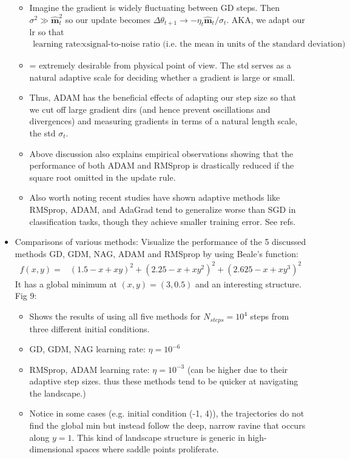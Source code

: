 \documentclass[norsk,a4paper,11pt]{article}
\begin{document}
\begin{itemize}
\begin{itemize}
			\item Imagine the gradient is widely fluctuating between GD steps. Then $\sigma^2 \gg \hat{\mathbf{m}}_t^2$ so our update becomes
			$\Delta \theta_{t+1} \rightarrow -\eta_t \hat{\mathbf{m}}_t/ \sigma_t$. AKA, we adapt our lr so that
			{\tiny
			\begin{align*}
				\text{learning rate} \propto \text{signal-to-noise ratio (i.e. the mean in units of the standard deviation)}
			\end{align*}}
			\item = extremely desirable from physical point of view. The std serves as a natural adaptive scale for deciding whether a gradient is large or small. 
			\item Thus, ADAM has the beneficial effects of adapting our step size so that we cut off large gradient dirs (and hence prevent oscillations and divergences) and measuring gradients in terms of a natural length scale, the std $\sigma_t$.
			\item Above discussion also explains empirical observations showing that the performance of both ADAM and RMSprop is drastically reduced if the square root omitted in the update rule. 
			\item Also worth noting recent studies have shown adaptive methods like RMSprop, ADAM, and AdaGrad tend to generalize worse than SGD in classification tasks, though they achieve smaller training error. See refs.
		\end{itemize}

		\item Comparisons of various methods:
		Visualize the performance of the 5 discussed methods GD, GDM, NAG, ADAM and RMSprop by using Beale's function:
		{\tiny
		\begin{align}
			f(x,y) =& (1.5 - x + xy)^2
			+ (2.25 - x + xy^2)^2 + (2.625 - x+ xy^3)^2
		\end{align}}
		It has a global minimum at $(x, y) = (3, 0.5)$ and an interesting structure.
		Fig 9:
		\begin{itemize}
			\item Shows the results of using all five methods for $N_{steps}=10^4$ steps from three different initial conditions.
			\item GD, GDM, NAG learning rate: $\eta = 10^{-6}$
			\item RMSprop, ADAM learning rate: $\eta = 10^{-3}$ (can be higher due to their adaptive step sizes. thus these methods tend to be quicker at navigating the landscape.)
			\item Notice in some cases (e.g. initial condition (-1, 4)), the trajectories do not find the global min but instead follow the deep, narrow ravine that occurs along $y=1$. This kind of landscape structure is generic in high-dimensional spaces where saddle points proliferate.
		\end{itemize}


\end{itemize}
\end{document}
